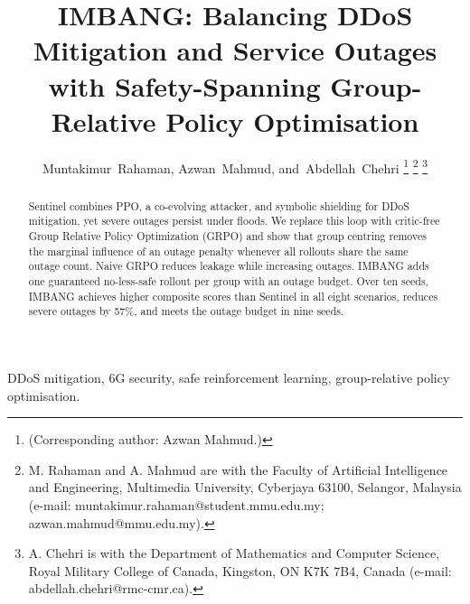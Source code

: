 \documentclass[journal]{IEEEtran}
\begin{document}
\title{IMBANG: Balancing DDoS Mitigation and Service Outages with Safety-Spanning Group-Relative Policy Optimisation}

\author{Muntakimur~Rahaman, Azwan~Mahmud, and~Abdellah~Chehri%
\thanks{(Corresponding author: Azwan Mahmud.)}%
\thanks{M. Rahaman and A. Mahmud are with the Faculty of Artificial Intelligence and Engineering, Multimedia University, Cyberjaya 63100, Selangor, Malaysia (e-mail: muntakimur.rahaman@student.mmu.edu.my; azwan.mahmud@mmu.edu.my).}%
\thanks{A. Chehri is with the Department of Mathematics and Computer Science, Royal Military College of Canada, Kingston, ON K7K 7B4, Canada (e-mail: abdellah.chehri@rmc-cmr.ca).}}


\maketitle

\begin{abstract}
Sentinel combines PPO, a co-evolving attacker, and symbolic shielding for DDoS mitigation, yet severe outages persist under floods. We replace this loop with critic-free Group Relative Policy Optimization (GRPO) and show that group centring removes the marginal influence of an outage penalty whenever all rollouts share the same outage count. Naive GRPO reduces leakage while increasing outages. IMBANG adds one guaranteed no-less-safe rollout per group with an outage budget. Over ten seeds, IMBANG achieves higher composite scores than Sentinel in all eight scenarios, reduces severe outages by 57\%, and meets the outage budget in nine seeds.
\end{abstract}

\begin{IEEEkeywords}
DDoS mitigation, 6G security, safe reinforcement learning, group-relative policy optimisation.
\end{IEEEkeywords}

\end{document}

